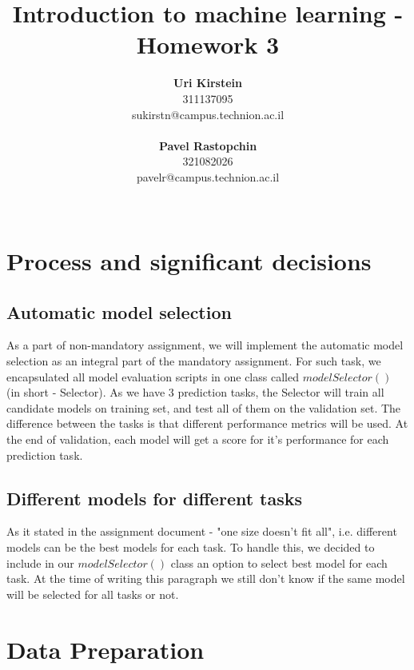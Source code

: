 \documentclass[12pt]{article}
\begin{document}
\title{\Huge Introduction to machine learning - Homework 3}

\author{
  \textbf{Uri Kirstein}\\
  311137095 \\ sukirstn@campus.technion.ac.il
  \\ \\
  \textbf{Pavel Rastopchin}\\
  321082026 \\ pavelr@campus.technion.ac.il
  \\ \\ 
}

\maketitle


\section{Process and significant decisions}
\subsection{Automatic model selection}
As a part of non-mandatory assignment, we will implement the automatic model selection as an integral part of the mandatory assignment. For such task, we encapsulated all model evaluation scripts in one class called $modelSelector()$ (in short - Selector). As we have 3 prediction tasks, the Selector will train all candidate models on training set, and test all of them on the validation set. The difference between the tasks is that different performance metrics will be used. At the end of validation, each model will get a score for it's performance for each prediction task.

\subsection{Different models for different tasks}
As it stated in the assignment document -  "one size doesn't fit all", i.e. different models can be the best models for each task. To handle this, we decided to include in our $modelSelector()$ class an option to select best model for each task. At the time of writing this paragraph we still don't know if the same model will be selected for all tasks or not.

\section{Data Preparation}
\end{document}
